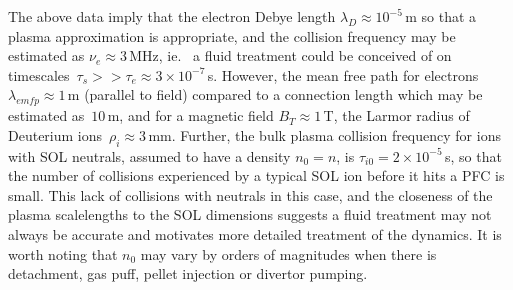 The above data imply that the electron Debye length $\lambda_D \approx 10^{-5}$\,m 
so that a plasma approximation is appropriate, and the collision
frequency may be estimated as $\nu_e \approx 3$\,MHz, ie. \
a fluid treatment
could be conceived of on timescales~$\tau_s >> \tau_e \approx  3 \times 10^{-7}$\,s.
However, the mean free path for electrons
$\lambda_{emfp} \approx 1$\,m (parallel to field) compared to a
connection length which may be estimated as~$10$\,m, and
for a magnetic field $B_T \approx 1$\,T, the Larmor radius
of Deuterium ions~$\rho_i  \approx 3$\,mm.
Further, the bulk plasma collision frequency for ions with SOL neutrals, assumed to
have a density $n_0=n$, is $\tau_{i0}= 2 \times 10^{-5}$\,s, so that the number
of collisions experienced by a typical SOL ion before it hits a PFC is small.
This lack of collisions with neutrals in this case, and the closeness of the plasma
scalelengths to the SOL dimensions suggests a fluid treatment may not always be
accurate and motivates more detailed treatment of the dynamics. It is worth noting
that $n_0$ may vary by orders of magnitudes when there is detachment,
gas puff, pellet injection or divertor pumping.

